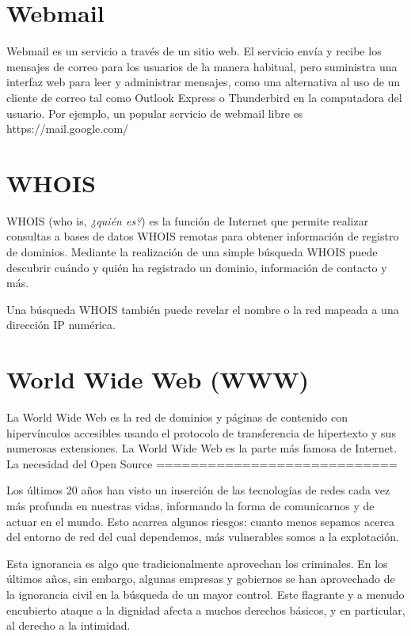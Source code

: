 \documentclass[10pt,a5paper,twoside,,]{book}
\begin{document}
\section{Webmail}\label{webmail}

Webmail es un servicio a través de un sitio web. El servicio envía y
recibe los mensajes de correo para los usuarios de la manera habitual,
pero suministra una interfaz web para leer y administrar mensajes, como
una alternativa al uso de un cliente de correo tal como Outlook Express
o Thunderbird en la computadora del usuario. Por ejemplo, un popular
servicio de webmail libre es https://mail.google.com/

\section{WHOIS}\label{whois}

WHOIS (who is, \emph{¿quién es?}) es la función de Internet que permite
realizar consultas a bases de datos WHOIS remotas para obtener
información de registro de dominios. Mediante la realización de una
simple búsqueda WHOIS puede descubrir cuándo y quién ha registrado un
dominio, información de contacto y más.

Una búsqueda WHOIS también puede revelar el nombre o la red mapeada a
una dirección IP numérica.

\section{World Wide Web (WWW)}\label{world-wide-web-www}

La World Wide Web es la red de dominios y páginas de contenido con
hipervínculos accesibles usando el protocolo de transferencia de
hipertexto y sus numerosas extensiones. La World Wide Web es la parte
más famosa de Internet. La necesidad del Open Source
============================

Los últimos 20 años han visto un inserción de las tecnologías de redes
cada vez más profunda en nuestras vidas, informando la forma de
comunicarnos y de actuar en el mundo. Esto acarrea algunos riesgos:
cuanto menos sepamos acerca del entorno de red del cual dependemos, más
vulnerables somos a la explotación.

Esta ignorancia es algo que tradicionalmente aprovechan los criminales.
En los últimos años, sin embargo, algunas empresas y gobiernos se han
aprovechado de la ignorancia civil en la búsqueda de un mayor control.
Este flagrante y a menudo encubierto ataque a la dignidad afecta a
muchos derechos básicos, y en particular, al derecho a la intimidad.
\end{document}
